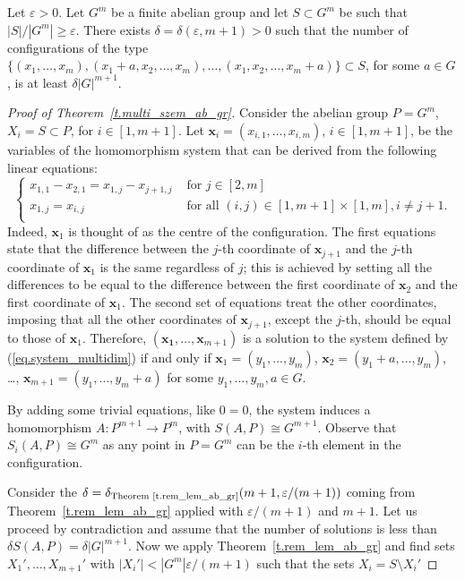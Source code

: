  \begin {theorem} 
  \label {t.multi_szem_ab_gr} Let $\varepsilon >0$. Let $G^m$ be a finite abelian group and let $S\subset G^m$ be such that $|S|/|G^m|\geq \varepsilon $. There exists $\delta =\delta (\varepsilon ,m+1)>0$ such that the number of configurations of the type $\{(x_1,\ldots ,x_m),(x_1+a,x_2,\ldots ,x_m),\ldots ,(x_1,x_2,\ldots ,x_m+a)\}\subset S$, for some $a\in G$, is at least $\delta |G|^{m+1}$. 
 \end {theorem} 
 
 \begin {proof} 
 [Proof of Theorem~\ref {t.multi_szem_ab_gr}] Consider the abelian group $P=G^m$, $X_i=S\subset P$, for $i\in [1,m+1]$. Let $\mathbf {x}_i=(x_{i,1},\ldots ,x_{i,m})$, $i\in [1,m+1]$, be the variables of the homomorphism system that can be derived from the following linear equations: \begin {equation}\label {eq.system_multidim} \left \{\begin {array}{cl} x_{1,1}-x_{2,1}= x_{1,j}-x_{j+1,j} & \text { for } j\in [2,m] \\ x_{1,j}=x_{i,j} & \text { for all }(i,j)\in [1,m+1]\times [1,m], i\neq j+1.\\ \end {array}\right . \end {equation} Indeed, $\mathbf {x}_1$ is thought of as the centre of the configuration. The first equations state that the difference between the $j$-th coordinate of $\mathbf {x}_{j+1}$ and the $j$-th coordinate of $\mathbf {x}_1$ is the same regardless of $j$; this is achieved by setting all the differences to be equal to the difference between the first coordinate of $\mathbf {x}_2$ and the first coordinate of $\mathbf {x}_1$. The second set of equations treat the other coordinates, imposing that all the other coordinates of $\mathbf {x}_{j+1}$, except the $j$-th, should be equal to those of $\mathbf {x}_1$. Therefore, $(\mathbf {x_1},\ldots ,\mathbf {x}_{m+1})$ is a solution to the system defined by (\ref {eq.system_multidim}) if and only if $\mathbf {x}_1=(y_1,\ldots ,y_m)$, $\mathbf {x}_2=(y_1+a,\ldots ,y_m)$, \ldots , $\mathbf {x}_{m+1}=(y_1,\ldots ,y_m+a)$ for some $y_1,\ldots ,y_m,a\in G$. \par By adding some trivial equations, like $0=0$, the system induces a homomorphism $A:P^{m+1} \to P^{m}$, with $S(A,P)\cong G^{m+1}$. Observe that $S_i(A,P)\cong G^m$ as any point in $P=G^m$ can be the $i$-th element in the configuration. \par Consider the $\delta =\delta _{\text {Theorem~\ref {t.rem_lem_ab_gr}}}(m+1,\varepsilon /(m+1))$ coming from Theorem~\ref {t.rem_lem_ab_gr} applied with $\varepsilon /(m+1)$ and $m+1$. Let us proceed by contradiction and assume that the number of solutions is less than $\delta S(A,P)=\delta |G|^{m+1}$. Now we apply Theorem~\ref {t.rem_lem_ab_gr} and find sets $X_1',\ldots ,X_{m+1}'$ with $|X_i'|<|G^m|\varepsilon /(m+1)$ such that the sets $X_i=S\setminus X_i'$ 
\end{proof}
